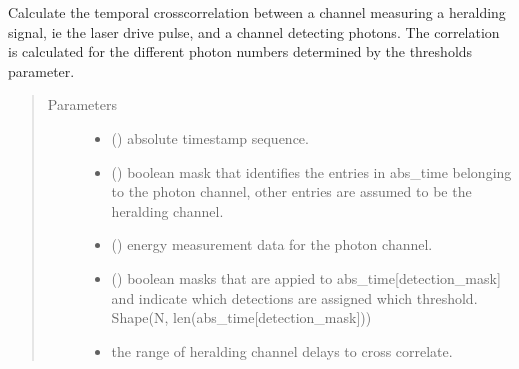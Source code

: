 \documentclass[letterpaper,10pt,english]{sphinxmanual}
\begin{document}
\begin{fulllineitems}
\label{\detokenize{tes:tes.analysis.drive_correlation}}
\sphinxAtStartPar
Calculate the temporal cross\sphinxhyphen{}correlation between a channel measuring a
heralding signal, ie the laser drive pulse, and a channel detecting photons.
The correlation is calculated for the different photon numbers determined by
the thresholds parameter.
\begin{quote}\begin{description}
\item[{Parameters}] \leavevmode\begin{itemize}
\item {} 
\sphinxAtStartPar
{} () \textendash{} absolute timestamp sequence.

\item {} 
\sphinxAtStartPar
{} () \textendash{} boolean mask that identifies the entries in
abs\_time belonging to the photon channel,
other entries are assumed to be the heralding
channel.

\item {} 
\sphinxAtStartPar
{} () \textendash{} energy measurement data for the photon channel.

\item {} 
\sphinxAtStartPar
{} () \textendash{} boolean masks that are appied to
abs\_time{[}detection\_mask{]} and indicate which detections
are assigned which threshold.
Shape(N, len(abs\_time{[}detection\_mask{]}))

\item {} 
\sphinxAtStartPar
{} \textendash{} the range of heralding channel delays to cross correlate.


\end{itemize}
\end{description}
\end{quote}
\end{fulllineitems}
\end{document}
